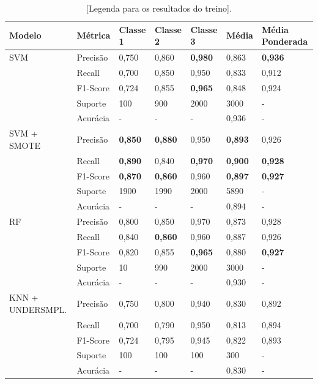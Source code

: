 \documentclass[12pt,a4paper]{article}
\begin{document}
\begin{table}[htbp]
  \caption{[Legenda para os resultados do treino].}
  \label{tab:resultados-treino}
  \begin{tabular}{|L{3.16cm}|L{1.90cm}|C{1.62cm}|C{1.62cm}|C{1.62cm}|C{1.62cm}|C{2.50cm}|}
    \hline
    \textbf{Modelo} & \textbf{Métrica} & \textbf{Classe 1} & \textbf{Classe 2} &
      \textbf{Classe 3} & \textbf{Média} & \textbf{Média Ponderada} \\ \hline
    SVM & Precisão & 0,750 & 0,860 & \textbf{0,980} & 0,863 & \textbf{0,936} \\ \hline
        & Recall   & 0,700 & 0,850 & 0,950 & 0,833 & 0,912 \\ \hline
        & F1-Score & 0,724 & 0,855 & \textbf{0,965} & 0,848 & 0,924 \\ \hline
        & Suporte  & 100 & 900 & 2000 & 3000 & - \\ \hline
        & Acurácia & - & - & - & 0,936 & - \\ \hline
    SVM + SMOTE & Precisão & \textbf{0,850} & \textbf{0,880} & 0,950 &
      \textbf{0,893} & 0,926 \\ \hline
                & Recall   & \textbf{0,890} & 0,840 & \textbf{0,970} &
      \textbf{0,900} & \textbf{0,928} \\ \hline
                & F1-Score & \textbf{0,870} & \textbf{0,860} & 0,960 &
      \textbf{0,897} & \textbf{0,927} \\ \hline
                & Suporte  & 1900 & 1990 & 2000 & 5890 & - \\ \hline
                & Acurácia & - & - & - & 0,894 & - \\ \hline
    RF & Precisão & 0,800 & 0,850 & 0,970 & 0,873 & 0,928 \\ \hline
       & Recall   & 0,840 & \textbf{0,860} & 0,960 & 0,887 & 0,926 \\ \hline
       & F1-Score & 0,820 & 0,855 & \textbf{0,965} & 0,880 & \textbf{0,927} \\ \hline
       & Suporte  & 10 & 990 & 2000 & 3000 & - \\ \hline
       & Acurácia & - & - & - & 0,930 & - \\ \hline
    KNN + UNDERSMPL. & Precisão & 0,750 & 0,800 & 0,940 & 0,830 & 0,892 \\ \hline
                     & Recall   & 0,700 & 0,790 & 0,950 & 0,813 & 0,894 \\ \hline
                     & F1-Score & 0,724 & 0,795 & 0,945 & 0,822 & 0,893 \\ \hline
                     & Suporte  & 100 & 100 & 100 & 300 & - \\ \hline
                     & Acurácia & - & - & - & 0,830 & - \\ \hline
  \end{tabular}
\end{table}
\end{document}
